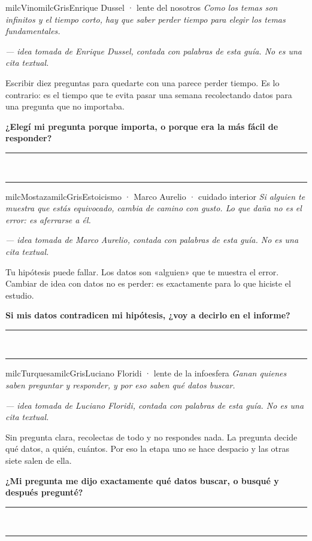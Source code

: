 \documentclass[11pt,letterpaper]{article}
\newcommand{\linead}[1]{\noindent\color{milcLinea}\rule{#1}{0.5pt}\color{milcNegro}}
\begin{document}
\begin{softbox}{milcVino}{milcGris}{Enrique Dussel · lente del nosotros}
\textit{Como los temas son infinitos y el tiempo corto, hay que saber perder tiempo para elegir los temas fundamentales.}

{\footnotesize\itshape\color{milcNegro!70}--- idea tomada de Enrique Dussel, contada con palabras de esta guía. No es una cita textual.}

Escribir diez preguntas para quedarte con una parece perder tiempo. Es lo contrario: es el tiempo que te evita pasar una semana recolectando datos para una pregunta que no importaba.

\textbf{¿Elegí mi pregunta porque importa, o porque era la más fácil de responder?}
\end{softbox}
\linead{\linewidth}\\[1mm]
\linead{\linewidth}

\begin{softbox}{milcMostaza}{milcGris}{Estoicismo · Marco Aurelio · cuidado interior}
\textit{Si alguien te muestra que estás equivocado, cambia de camino con gusto. Lo que daña no es el error: es aferrarse a él.}

{\footnotesize\itshape\color{milcNegro!70}--- idea tomada de Marco Aurelio, contada con palabras de esta guía. No es una cita textual.}

Tu hipótesis puede fallar. Los datos son «alguien» que te muestra el error. Cambiar de idea con datos no es perder: es exactamente para lo que hiciste el estudio.

\textbf{Si mis datos contradicen mi hipótesis, ¿voy a decirlo en el informe?}
\end{softbox}
\linead{\linewidth}\\[1mm]
\linead{\linewidth}

\begin{softbox}{milcTurquesa}{milcGris}{Luciano Floridi · lente de la infoesfera}
\textit{Ganan quienes saben preguntar y responder, y por eso saben qué datos buscar.}

{\footnotesize\itshape\color{milcNegro!70}--- idea tomada de Luciano Floridi, contada con palabras de esta guía. No es una cita textual.}

Sin pregunta clara, recolectas de todo y no respondes nada. La pregunta decide qué datos, a quién, cuántos. Por eso la etapa uno se hace despacio y las otras siete salen de ella.

\textbf{¿Mi pregunta me dijo exactamente qué datos buscar, o busqué y después pregunté?}
\end{softbox}
\linead{\linewidth}\\[1mm]
\linead{\linewidth}
\end{document}
